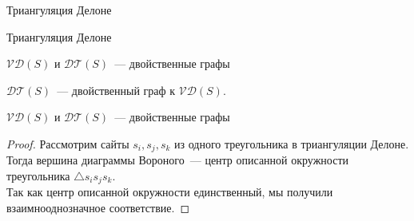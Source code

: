 \documentclass[12pt,aspectratio=169,svgnames]{beamer}
\begin{document}
    \begin{frame}{Триангуляция Делоне}
         \vspace{2mm}
         \begin{center}


        \end{center}

    \end{frame}

    \begin{frame}{Триангуляция Делоне}
         \vspace{2mm}
         \begin{center}


        \end{center}

    \end{frame}

    \begin{frame}{$\mathcal{V}\mathcal{D}(S)$ и $\mathcal{D}\mathcal{T}(S)$~--- двойственные графы}

        \vspace{2mm}

        \begin{thm}

            $\mathcal{D}\mathcal{T}(S)$~--- двойственный граф к $\mathcal{V}\mathcal{D}(S)$.

        \end{thm}

        \begin{center}


        \end{center}

    \end{frame}

    \begin{frame}{$\mathcal{V}\mathcal{D}(S)$ и $\mathcal{D}\mathcal{T}(S)$~--- двойственные графы}

        \begin{proof}

            Рассмотрим сайты $s_i, s_j, s_k$ из одного треугольника в триангуляции Делоне. Тогда вершина диаграммы Вороного~---
            центр описанной окружности треугольника $\triangle s_i s_j s_k$.\\

            Так как центр описанной окружности единственный, мы получили взаимнооднозначное соответствие.

        \end{proof}

    \end{frame}
\end{document}
